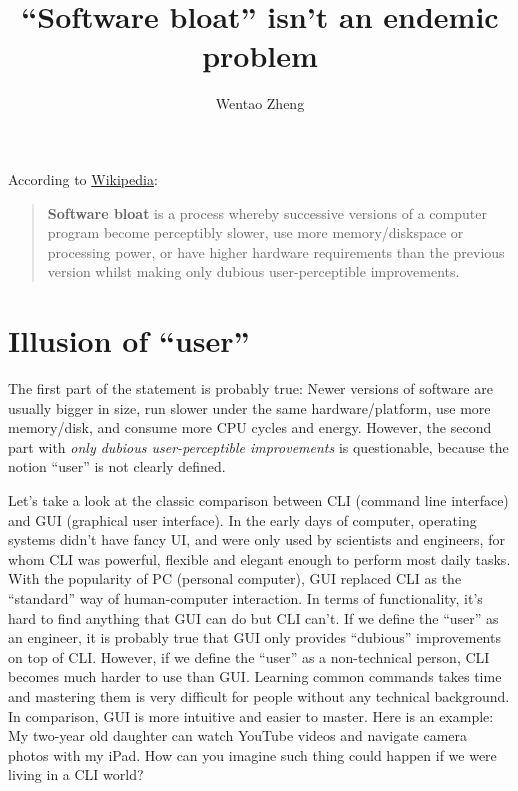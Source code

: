 \documentclass[a4paper, 11pt]{article}
\begin{document}
\title{``Software bloat'' isn't an endemic problem}
\author{Wentao Zheng}
\maketitle
\thispagestyle{empty}
\pagestyle{empty}

According to
\href{http://en.wikipedia.org/wiki/Software_bloat}{Wikipedia}:
\begin{quote}
  \textbf{Software bloat} is a process whereby successive versions of
  a computer program become perceptibly slower, use more
  memory/diskspace or processing power, or have higher hardware
  requirements than the previous version whilst making only dubious
  user-perceptible improvements.
\end{quote}

\section*{Illusion of ``user''}

The first part of the statement is probably true: Newer versions of
software are usually bigger in size, run slower under the same
hardware/platform, use more memory/disk, and consume more CPU cycles
and energy. However, the second part with \emph{only dubious
  user-perceptible improvements} is questionable, because the notion
``user'' is not clearly defined.

Let's take a look at the classic comparison between CLI (command line
interface) and GUI (graphical user interface). In the early days of
computer, operating systems didn't have fancy UI, and were only used
by scientists and engineers, for whom CLI was powerful, flexible and
elegant enough to perform most daily tasks. With the popularity of PC
(personal computer), GUI replaced CLI as the ``standard'' way of
human-computer interaction. In terms of functionality, it's hard to
find anything that GUI can do but CLI can't. If we define the ``user''
as an engineer, it is probably true that GUI only provides ``dubious''
improvements on top of CLI. However, if we define the ``user'' as a
non-technical person, CLI becomes much harder to use than
GUI. Learning common commands takes time and mastering them is very
difficult for people without any technical background. In comparison,
GUI is more intuitive and easier to master. Here is an example: My
two-year old daughter can watch YouTube videos and navigate camera
photos with my iPad. How can you imagine such thing could happen if we
were living in a CLI world?
\end{document}
